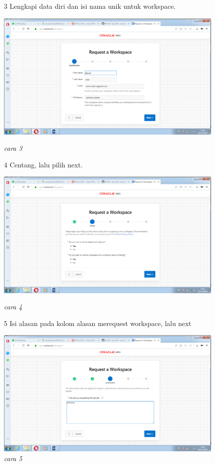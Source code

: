 \begin{enumerate}
\begin{figure}[!htbp]
\item[3]Lengkapi data diri dan isi nama unik  untuk workspace.
    \begin{center}
    \includegraphics[scale=0.2]{apex/db1.png}
    \caption{\textit{cara 3}}
    \end{center}

        
\item[4]Centang, lalu pilih next.  
    \begin{center}
    \includegraphics[scale=0.2]{apex/db2.png}
    \caption{\textit{cara 4}}
    \end{center}
      
\item[5]Isi alasan pada kolom alasan merequest workspace, lalu next
    \begin{center}
    \includegraphics[scale=0.2]{apex/db3.png}
    \caption{\textit{cara 5}}
    \end{center}
 

\end{figure}
\end{enumerate}
